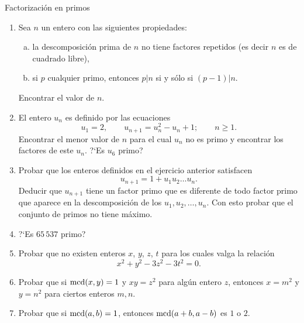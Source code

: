 \begin{section}{Factorización en primos}
\begin{enumerate}[1)]
\item Sea $n$ un entero con las siguientes propiedades: 
\begin{enumerate}[a)]
	\item  la
	descomposición prima de $n$ no tiene factores repetidos (es decir
	$n$ es de cuadrado libre), 
	\item si $p$ cualquier primo, entonces
	$p|n$ si  y sólo si $(p-1)|n$.
\end{enumerate}
Encontrar el valor de $n$.

\item El entero $u_n$ es definido por las ecuaciones
$$
u_1=2,\qquad u_{n+1}=u_n^2-u_n+1;\qquad \text{$n\ge1$}.
$$
Encontrar el menor valor de $n$ para el cual $u_n$ no es primo y
encontrar los factores de este $u_n$. ?`Es $u_6$ primo?

\item Probar que los enteros definidos en el ejercicio anterior satisfacen
$$
u_{n+1}= 1 + u_1u_2 \ldots u_n.
$$
Deducir que $u_{n+1}$ tiene un factor primo que es diferente de
todo factor primo que aparece en la descomposición de los
$u_1,u_2,\ldots,u_n$. Con esto probar que el conjunto de primos no
tiene máximo.

\item ?`Es $65\,537$ primo?

\item Probar que no existen enteros $x$, $y$, $z$, $t$ para los cuales
valga la relación
$$x^2+y^2-3z^2-3t^2=0.
$$

\item Probar que si $\operatorname{mcd}(x,y)=1$ y $xy=z^2$ para algún entero $z$,
entonces $x=m^2$ y $y=n^2$ para ciertos enteros $m,n$.

\item Probar que si $\operatorname{mcd}(a,b)=1$, entonces $\operatorname{mcd}(a+b,a-b)$ es $1$ o $2$.
\end{enumerate}
\end{section}



